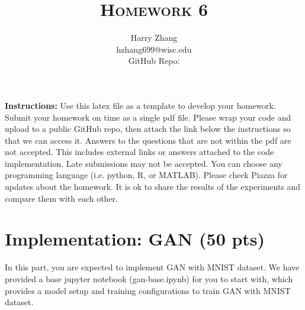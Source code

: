 \documentclass[a4paper]{article}
\title{\textsc{Homework 6}} %
\author{
	Harry Zhang\\
	hzhang699@wisc.edu\\
	GitHub Repo: 
}
\date{}
\theoremstyle{definition}
\begin{document}
	
	\maketitle 
	
        \textbf{Instructions:}
        Use this latex file as a template to develop your homework. Submit your homework on time as a single pdf file. Please wrap your code and upload to a public GitHub repo, then attach the link below the instructions so that we can access it. Answers to the questions that are not within the pdf are not accepted. This includes external links or answers attached to the code implementation. Late submissions may not be accepted. You can choose any programming language (i.e. python, R, or MATLAB). Please check Piazza for updates about the homework. It is ok to share the results of the experiments and compare them with each other.
        \vspace{0.1in}
	
	\section{Implementation: GAN (50 pts)}
	In this part, you are expected to implement GAN with MNIST dataset. We have provided a base jupyter notebook (gan-base.ipynb) for you to start with, which provides a model setup and training configurations to train GAN with MNIST dataset.
	
\end{document}

